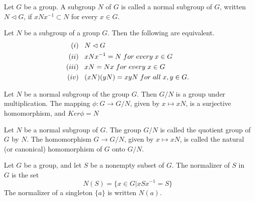 \begin{defi}
    Let $G$ be a group. A subgroup $N$ of $G$ is called a normal subgroup of $G$, written $N\vartriangleleft G$, if $xNx^{-1}\subset N$ for every $x\in G$.
\end{defi}
\begin{teo}
Let $N$ be a subgroup of a group $G$. Then the following are equivalent.
\begin{align*}
    (i)&\hspace{.3cm}N\vartriangleleft G\\
    (ii)&\hspace{.3cm}xNx^{-1}=N\hspace{.1cm}for\hspace{.1cm}every\hspace{.1cm}x\in G\\
    (iii)&\hspace{.3cm}xN=Nx\hspace{.1cm}for\hspace{.1cm}every\hspace{.1cm}x\in G\\
    (iv)&\hspace{.3cm}(xN)(yN)=xyN\hspace{.1cm}for\hspace{.1cm}all\hspace{.1cm}x,y\in G.
\end{align*}
\end{teo}
\begin{teo}
    Let $N$ be a normal subgroup of the group $G$. Then $G/N$ is a group under multiplication. The mapping $\phi:G\rightarrow G/N$, given by $x\mapsto xN$, is a surjective homomorphism, and $Ker\phi=N$
\end{teo}
\begin{defi}
    Let $N$ be a normal subgroup of $G$. The group $G/N$ is called the quotient group of $G$ by $N$. The homomorphism $G\rightarrow G/N$, given by $x\mapsto xN$, is called the natural (or canonical) homomorphism of $G$ onto $G/N$.
\end{defi}
\begin{defi}
    Let $G$ be a group, and let $S$ be a nonempty subset of $G$. The normalizer of $S$ in $G$ is the set 
    \begin{equation*}
        N(S)=\{x\in G|xSx^{-1}=S\}
    \end{equation*}
    The normalizer of a singleton $\{a\}$ is written $N(a)$.
\end{defi}
